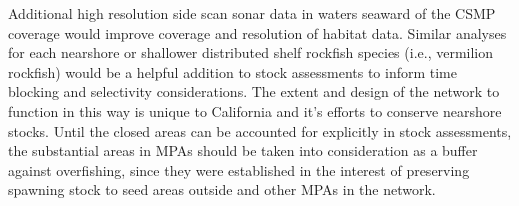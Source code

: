 \documentclass[11pt,
  english,
  a4paper,
]{article}
\begin{document}
Additional high resolution side scan sonar data in waters seaward of the CSMP coverage would improve coverage and resolution of habitat data. Similar analyses for each nearshore or shallower distributed shelf rockfish species (i.e., vermilion rockfish) would be a helpful addition to stock assessments to inform time blocking and selectivity considerations. The extent and design of the network to function in this way is unique to California and it's efforts to conserve nearshore stocks. Until the closed areas can be accounted for explicitly in stock assessments, the substantial areas in MPAs should be taken into consideration as a buffer against overfishing, since they were established in the interest of preserving spawning stock to seed areas outside and other MPAs in the network.

\leavevmode\tagmcend\tagstructend\par

\newpage

\begingroup\fontsize{10}{12}\selectfont
\begingroup\fontsize{10}{12}\selectfont
\end{document}
